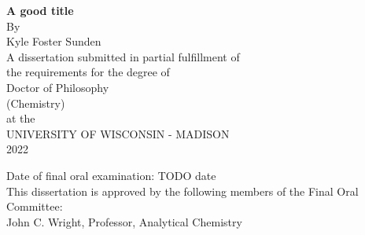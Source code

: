 \documentclass{dissertation}
\begin{document}
\raggedbottom


\begin{centering}
\thispagestyle{empty}


\textbf{A good title} \\
\vspace{80 pt}
By \\
Kyle Foster Sunden \\
\vspace{40 pt}
A dissertation submitted in partial fulfillment of \\
the requirements for the degree of \\
\vspace{10 pt}
Doctor of Philosophy \\
(Chemistry) \\
\vspace{40 pt}
at the \\
UNIVERSITY OF WISCONSIN - MADISON \\
2022 \\
\end{centering}

\vfill

\noindent Date of final oral examination: TODO date \\
This dissertation is approved by the following members of the Final Oral Committee: \\
\-\hspace{1cm} John C. Wright, Professor, Analytical Chemistry \\

\cleardoublepage  %


\renewcommand{\baselinestretch}{0.5}\normalsize
\tableofcontents
\listoffigures
\listoftables
\renewcommand{\baselinestretch}{1}\normalsize

\cleardoublepage


\cleardoublepage

\afterpage{\blankpage}  %

\doublespacing  %
\end{document}
